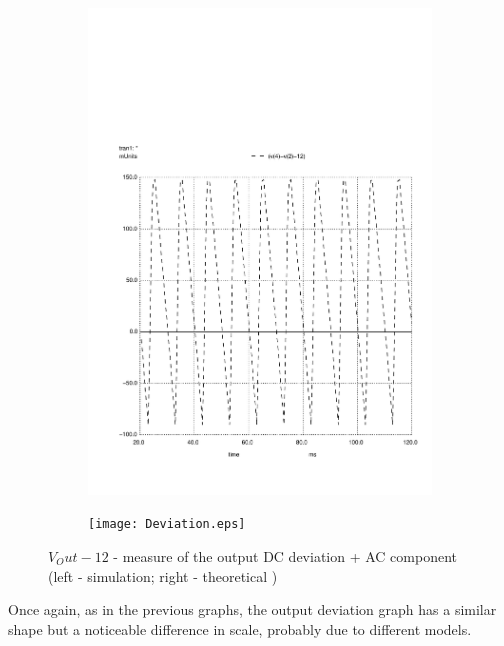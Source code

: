 \begin{figure}[h]
    \centering
    \begin{subfigure}{0.23\textwidth}
        \includegraphics[width=\linewidth, clip]{solution12.pdf}
        \label{fig:output1}
    \end{subfigure}
    \begin{subfigure}{0.23\textwidth}
        \texttt{[image: Deviation.eps]}
        \label{fig:output2}
    \end{subfigure}
    \caption{\small $V_Out - 12$ - measure of the output DC deviation + AC component (left - simulation; right - theoretical )}
    \label{output_deviation}
\end{figure}

Once again, as in the previous graphs, the output deviation graph has a similar shape but a noticeable difference in scale, probably due to different models.




